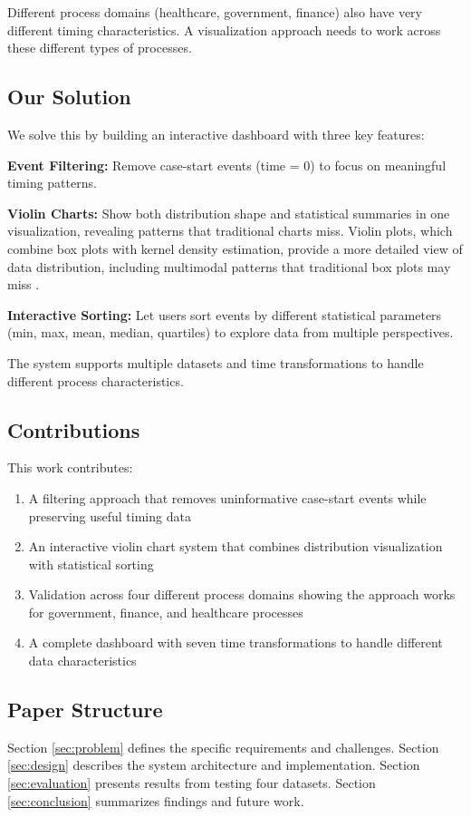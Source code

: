 Different process domains (healthcare, government, finance) also have very different timing characteristics. A visualization approach needs to work across these different types of processes.

\subsection{Our Solution}
\label{subsec:solution}

We solve this by building an interactive dashboard with three key features:

\textbf{Event Filtering:} Remove case-start events (time = 0) to focus on meaningful timing patterns.

\textbf{Violin Charts:} Show both distribution shape and statistical summaries in one visualization, revealing patterns that traditional charts miss. Violin plots, which combine box plots with kernel density estimation, provide a more detailed view of data distribution, including multimodal patterns that traditional box plots may miss \cite{hintze1998violin}.

\textbf{Interactive Sorting:} Let users sort events by different statistical parameters (min, max, mean, median, quartiles) to explore data from multiple perspectives.

The system supports multiple datasets and time transformations to handle different process characteristics.

\subsection{Contributions}
\label{subsec:contributions}

This work contributes:

\begin{enumerate}
    \item A filtering approach that removes uninformative case-start events while preserving useful timing data
    
    \item An interactive violin chart system that combines distribution visualization with statistical sorting
    
    \item Validation across four different process domains showing the approach works for government, finance, and healthcare processes
    
    \item A complete dashboard with seven time transformations to handle different data characteristics
\end{enumerate}

\subsection{Paper Structure}
\label{subsec:structure}

Section \ref{sec:problem} defines the specific requirements and challenges. Section \ref{sec:design} describes the system architecture and implementation. Section \ref{sec:evaluation} presents results from testing four datasets. Section \ref{sec:conclusion} summarizes findings and future work.
